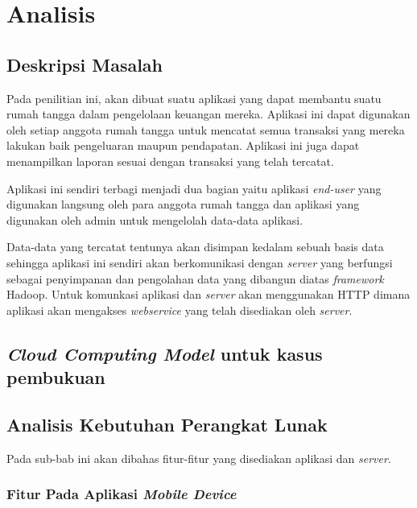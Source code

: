 \chapter{Analisis}
\label{chap:analisis}

\section{Deskripsi Masalah}
\label{sec:deskripsimasalah}

\hspace{0,5cm}Pada penilitian ini, akan dibuat suatu aplikasi yang dapat membantu suatu rumah tangga dalam pengelolaan keuangan mereka. Aplikasi ini dapat digunakan oleh setiap anggota rumah tangga untuk mencatat semua transaksi yang mereka lakukan baik pengeluaran maupun pendapatan. Aplikasi ini juga dapat menampilkan laporan sesuai dengan transaksi yang telah tercatat.

Aplikasi ini sendiri terbagi menjadi dua bagian yaitu aplikasi \textit{end-user} yang digunakan langsung oleh para anggota rumah tangga dan aplikasi yang digunakan oleh admin untuk mengelolah data-data aplikasi.

Data-data yang tercatat tentunya akan disimpan kedalam sebuah basis data sehingga aplikasi ini sendiri akan berkomunikasi dengan \textit{server} yang berfungsi sebagai penyimpanan dan pengolahan data yang dibangun diatas \textit{framework} Hadoop. Untuk komunkasi aplikasi dan \textit{server} akan menggunakan HTTP dimana aplikasi akan mengakses \textit{webservice} yang telah disediakan oleh \textit{server}.

\section{\textit{Cloud Computing Model} untuk kasus pembukuan}

\section{Analisis Kebutuhan Perangkat Lunak}

\hspace{0,5cm}Pada sub-bab ini akan dibahas fitur-fitur yang disediakan aplikasi dan \textit{server}.

\subsection{Fitur Pada Aplikasi \textit{Mobile Device}}

